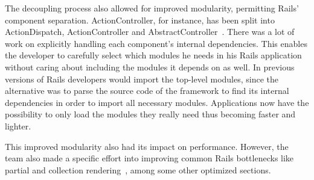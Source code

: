 The decoupling process also allowed for improved modularity, permitting Rails' component separation. ActionController, for instance, has been split into ActionDispatch, ActionController and AbstractController~\cite{vaporware_to_awesome}. There was a lot of work on explicitly handling each component's internal dependencies. This enables the developer to carefully select which modules he needs in his Rails application without caring about including the modules it depends on as well. In previous versions of Rails developers would import the top-level modules, since the alternative was to parse the source code of the framework to find its internal dependencies in order to import all necessary modules. Applications now have the possibility to only load the modules they really need thus becoming faster and lighter.

This improved modularity also had its impact on performance. However, the team also made a specific effort into improving common Rails bottlenecks like partial and collection rendering~\cite{vaporware_to_awesome}, among some other optimized sections.

